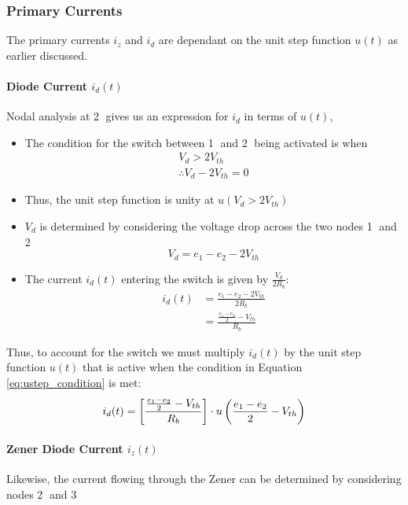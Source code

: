 \subsubsection{Primary Currents}
The primary currents $i_z$ and $i_d$ are dependant on the unit step function $u(t)$ as earlier discussed.
\paragraph{Diode Current $i_d(t)$} Nodal analysis at \textcircled{2} gives us an expression for $i_d$ in terms of $u(t)$,

\begin{itemize}
	\item The condition for the switch between \textcircled{1} and \textcircled{2} being activated is when
	\begin{equation}
 		\begin{split}
 			V_d > 2V_{th} \\
 			\therefore V_d - 2V_{th} = 0
 		\end{split}
 		\label{eq:ustep_condition}
 	\end{equation}
	\item Thus, the unit step function is unity at $u(V_d > 2V_{th})$
	\item $V_d$ is determined by considering the voltage drop across the two nodes \textcircled{1} and \textcircled{2} $$V_d = e_1 - e_2 - 2V_{th}$$
	\item The current $i_d(t)$ entering the switch is given by $\frac{V_d}{2R_b}$:
	\begin{equation}
		\begin{split}
			i_d(t) &= \frac{e_1 - e_2 - 2V_{th}}{2R_b} \\
				   &= \frac{\frac{e_1 - e_2}{2} - V_{th}}{R_b}	
		\end{split}
	\end{equation}
\end{itemize} 
Thus, to account for the switch we must multiply $i_d(t)$ by the unit step function $u(t)$ that is active when the condition in Equation \ref{eq:ustep_condition} is met:
\begin{equation}
	i_d(t) = \left[\frac{\frac{e_1 - e_2}{2} - V_{th}}{R_b} \right]\cdot u\left(\frac{e_1 - e_2}{2} - V_{th} \right)
	\label{eq:diode_current}
\end{equation}

\paragraph{Zener Diode Current $i_z(t)$}
Likewise, the current flowing through the Zener can be determined by considering nodes \textcircled{2} and \textcircled{3}

